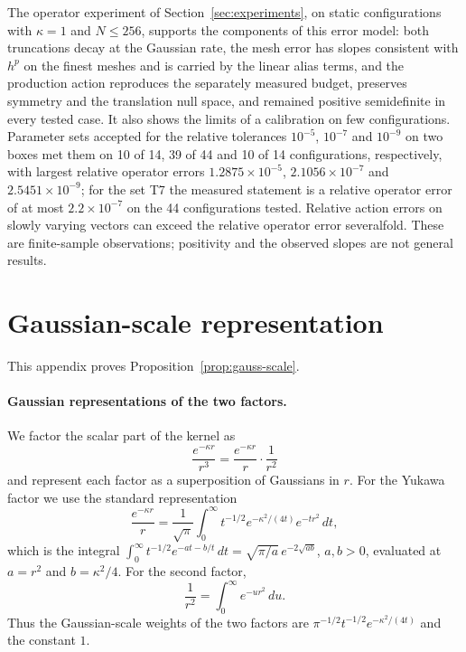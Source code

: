 \documentclass[11pt]{article}
\theoremstyle{plain}
\DeclareRobustCommand{\_}{\textunderscore\allowbreak}
\begin{document}
The operator experiment of Section~\ref{sec:experiments}, on static
configurations with $\kappa=1$ and $N\le256$, supports the components of this
error model: both truncations decay at the Gaussian rate, the mesh error has
slopes consistent with $h^p$ on the finest meshes and is carried by the linear
alias terms, and the production action reproduces the separately measured
budget, preserves symmetry and the translation null space, and remained
positive semidefinite in every tested case. It also shows the limits of a
calibration on few configurations. Parameter sets accepted for the relative
tolerances $10^{-5}$, $10^{-7}$ and $10^{-9}$ on two boxes met them on 10 of 14,
39 of 44 and 10 of 14 configurations, respectively, with largest relative
operator errors $1.2875\times10^{-5}$, $2.1056\times10^{-7}$ and
$2.5451\times10^{-9}$; for the set T7 the measured statement is a relative
operator error of at most $2.2\times10^{-7}$ on the 44 configurations tested.
Relative action errors on slowly varying vectors can exceed the relative
operator error severalfold. These are finite-sample observations; positivity
and the observed slopes are not general results.

\appendix

\section{Gaussian-scale representation}
\label{app:gauss-scale}

This appendix proves Proposition~\ref{prop:gauss-scale}.

\paragraph{Gaussian representations of the two factors.}
We factor the scalar part of the kernel as
\begin{equation}
\frac{e^{-\kappa r}}{r^3}
=
\frac{e^{-\kappa r}}{r}\cdot\frac{1}{r^2}
\end{equation}
and represent each factor as a superposition of Gaussians in $r$.
For the Yukawa factor we use the standard representation
\begin{equation}
\frac{e^{-\kappa r}}{r}
=
\frac{1}{\sqrt{\pi}}
\int_0^\infty
t^{-1/2}
e^{-\kappa^2/(4t)}
e^{-t r^2}\,dt,
\end{equation}
which is the integral
$\int_0^\infty t^{-1/2}e^{-at-b/t}\,dt=\sqrt{\pi/a}\,e^{-2\sqrt{ab}}$,
$a,b>0$, evaluated at $a=r^2$ and $b=\kappa^2/4$. For the second factor,
\begin{equation}
\frac{1}{r^2}
=
\int_0^\infty e^{-u r^2}\,du .
\end{equation}
Thus the Gaussian-scale weights of the two factors are
$\pi^{-1/2}t^{-1/2}e^{-\kappa^2/(4t)}$ and the constant $1$.
\end{document}

